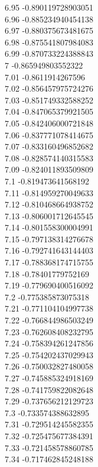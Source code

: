 {6.95	-0.890119728903051\\
6.96	-0.885234940454138\\
6.97	-0.880375673481675\\
6.98	-0.875541807984083\\
6.99	-0.870733224388843\\
7	-0.865949803552322\\
7.01	-0.8611914267596\\
7.02	-0.856457975724276\\
7.03	-0.851749332588252\\
7.04	-0.847065379921505\\
7.05	-0.842406000721848\\
7.06	-0.837771078414675\\
7.07	-0.833160496852682\\
7.08	-0.828574140315583\\
7.09	-0.824011893509809\\
7.1	-0.819473641568192\\
7.11	-0.814959270049633\\
7.12	-0.810468664938752\\
7.13	-0.806001712645545\\
7.14	-0.801558300004991\\
7.15	-0.797138314276678\\
7.16	-0.792741643144403\\
7.17	-0.788368174715755\\
7.18	-0.78401779752169\\
7.19	-0.779690400516092\\
7.2	-0.775385873075318\\
7.21	-0.771104104997738\\
7.22	-0.766844986503249\\
7.23	-0.762608408232795\\
7.24	-0.758394261247856\\
7.25	-0.754202437029943\\
7.26	-0.750032827480058\\
7.27	-0.745885324918169\\
7.28	-0.741759822082648\\
7.29	-0.737656212129723\\
7.3	-0.733574388632895\\
7.31	-0.729514245582355\\
7.32	-0.725475677384391\\
7.33	-0.721458578860785\\
7.34	-0.717462845248188\\
}
